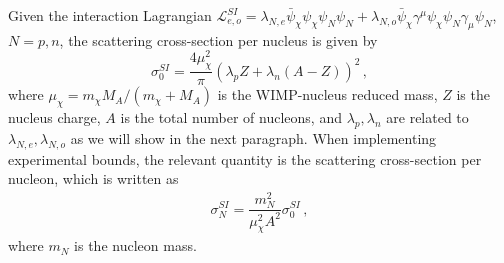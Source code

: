 \documentclass[12pt,letterpaper]{article}
\begin{document}
Given the interaction Lagrangian $\mathcal{L}^{SI}_{e,o}= \lambda_{N,e}\bar{\psi}_\chi\psi_\chi\psi_N\psi_N + \lambda_{N,o}\bar{\psi}_\chi\gamma^\mu\psi_\chi\psi_N\gamma_\mu\psi_N $,  $N=p,n$, the scattering cross-section per nucleus is given by
\begin{equation}
\label{eq:sigma0}
\sigma_0^{SI} = \dfrac{4\mu_\chi^2}{\pi}\left(\lambda_pZ+\lambda_n(A-Z)\right)^2\,,
\end{equation}
where $\mu_\chi=m_{\chi}M_A/(m_{\chi}+M_A)$ is the WIMP-nucleus reduced mass, $Z$ is the nucleus charge, $A$ is the total number of nucleons, and $\lambda_p , \lambda_n$ are related to $\lambda_{N,e}, \lambda_{N,o}$ as we will show in the next paragraph. When implementing experimental bounds, the relevant quantity is the scattering cross-section per nucleon, which is written as
\begin{align}
\label{eq:sigmaN}
\sigma_N^{SI} = \dfrac{m_N^2}{\mu_\chi^2 A^2}\sigma_0^{SI}\,,
\end{align}
where $m_N$ is the nucleon mass.
\end{document}
